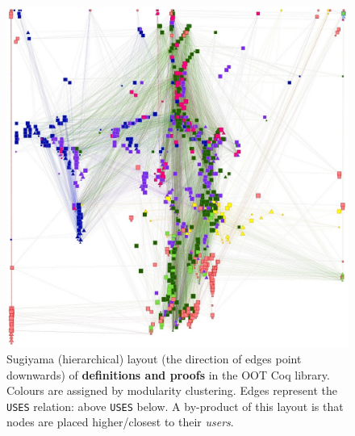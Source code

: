 \begin{figure}[tp]
  \begin{minipage}{0.5\textwidth-0.5em}
    \centering
    \includegraphics[width=\textwidth]{img/oot/hierarchical}
    \caption{Sugiyama (hierarchical) layout (the direction of edges point
      downwards) of \textbf{definitions and proofs} in the OOT Coq
      library. Colours are assigned by modularity clustering. Edges represent
      the \texttt{USES} relation: above \texttt{USES} below. A by-product of
      this layout is that nodes are placed higher/closest to their
      \emph{users}.}\label{fig:oot:hier}
  \end{minipage}%
  \hspace{1em}%
  \begin{minipage}{0.5\textwidth-0.5em}
    \centering

\end{minipage}
\end{figure}
